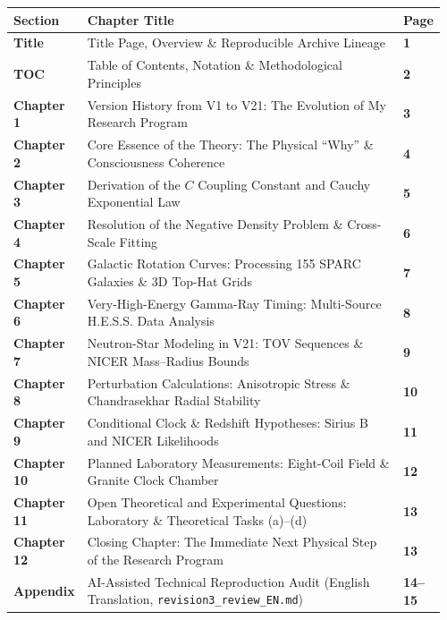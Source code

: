 \documentclass[10pt,a4paper]{article}
\begin{document}
\par\vspace{1pt}
{\footnotesize
\begin{tabular}{@{}>{\bfseries\color{navy}}p{0.12\linewidth}p{0.76\linewidth}>{\raggedleft\arraybackslash\bfseries}p{0.08\linewidth}@{}}
\toprule
Section & Chapter Title & Page \\
\midrule
Title & Title Page, Overview \& Reproducible Archive Lineage & 1 \\
TOC & Table of Contents, Notation \& Methodological Principles & 2 \\
Chapter 1 & Version History from V1 to V21: The Evolution of My Research Program & 3 \\
Chapter 2 & Core Essence of the Theory: The Physical ``Why'' \& Consciousness Coherence & 4 \\
Chapter 3 & Derivation of the $C$ Coupling Constant and Cauchy Exponential Law & 5 \\
Chapter 4 & Resolution of the Negative Density Problem \& Cross-Scale Fitting & 6 \\
Chapter 5 & Galactic Rotation Curves: Processing 155 SPARC Galaxies \& 3D Top-Hat Grids & 7 \\
Chapter 6 & Very-High-Energy Gamma-Ray Timing: Multi-Source H.E.S.S. Data Analysis & 8 \\
Chapter 7 & Neutron-Star Modeling in V21: TOV Sequences \& NICER Mass--Radius Bounds & 9 \\
Chapter 8 & Perturbation Calculations: Anisotropic Stress \& Chandrasekhar Radial Stability & 10 \\
Chapter 9 & Conditional Clock \& Redshift Hypotheses: Sirius B and NICER Likelihoods & 11 \\
Chapter 10 & Planned Laboratory Measurements: Eight-Coil Field \& Granite Clock Chamber & 12 \\
Chapter 11 & Open Theoretical and Experimental Questions: Laboratory \& Theoretical Tasks (a)--(d) & 13 \\
Chapter 12 & Closing Chapter: The Immediate Next Physical Step of the Research Program & 13 \\
Appendix & AI-Assisted Technical Reproduction Audit (English Translation, \texttt{revision3\_review\_EN.md}) & 14--15 \\
\bottomrule
\end{tabular}}
\end{document}
